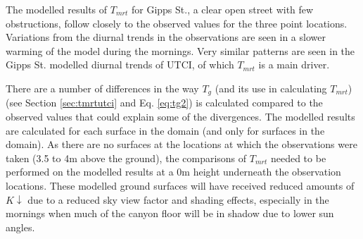 \documentclass[final,3p,times,authoryear]{elsarticle}
\begin{document}
%

The modelled results of $T_{mrt}$ for Gipps St., a clear open street with few obstructions, follow closely to the observed values for the three point locations. Variations from the diurnal trends in the observations are seen in a slower warming of the model during the mornings. Very similar patterns are seen in the Gipps St. modelled diurnal trends of UTCI, of which $T_{mrt}$ is a main driver.





There are a number of differences in the way $T_{g}$ (and its use in calculating $T_{mrt}$) (see Section \ref{sec:tmrtutci} and Eq. \ref{eq:tg2}) is calculated compared to the observed values that could explain some of the divergences. The modelled results are calculated for each surface in the domain (and only for surfaces in the domain). As there are no surfaces at the locations at which the observations were taken (3.5 to 4m above the ground), the comparisons of $T_{mrt}$ needed to be performed on the modelled results at a 0m height underneath the observation locations. These modelled ground surfaces will have received reduced amounts of $K\downarrow$ due to a reduced sky view factor and shading effects, especially in the mornings when much of the canyon floor will be in shadow due to lower sun angles.
\end{document}
